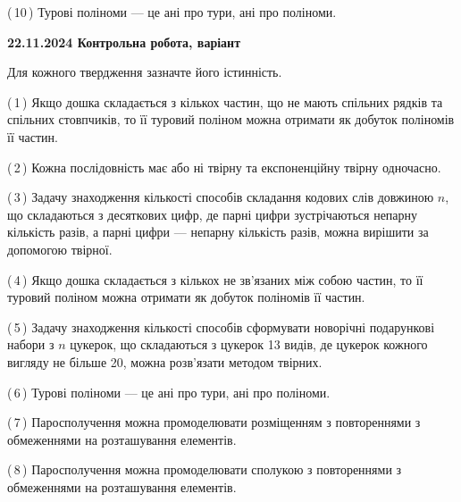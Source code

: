 \documentclass[12pt, ukrainian]{article}
\begin{document}
\begin {large}
\begin {large}
\begin {large}
\begin {large}
\begin {large}
\begin {large}
\begin {large}
\begin {large}
\begin {large}
\begin {large}
\begin {large}
\begin {large}
\begin {large}
\begin {large}
\begin {large}
\begin {large}
\begin {large}
\begin {large}
\begin {large}
\begin {large}
\begin {large}
\begin {large}
\begin {large}
\begin {large}
\begin {large}
\begin {large}
\begin {large}
\begin {large}
\begin {large}
{(\,10\,) Турові поліноми --- це ані про тури, ані про поліноми.%




\vspace{5mm}
}
\newpage

\begin {large}

\textbf{22.11.2024 Контрольна робота, варіант  }\par


{
Для кожного твердження зазначте його істинність.\par

\vspace{2mm}

(\,1\,) Якщо дошка складається з кількох частин, що не мають спільних рядків та спільних стовпчиків, то її туровий поліном можна отримати як добуток поліномів її частин.%



(\,2\,) Кожна послідовність має або ні твірну та експоненційну твірну одночасно.%



(\,3\,) Задачу знаходження кількості способів складання кодових слів довжиною $n$, що складаються з десяткових цифр, де парні цифри зустрічаються непарну кількість разів, а парні цифри — непарну кількість разів, можна вирішити за допомогою твірної.%



(\,4\,) Якщо дошка складається з кількох не зв’язаних між собою частин, то її туровий поліном можна отримати як добуток поліномів її частин.%



(\,5\,) Задачу знаходження кількості способів сформувати новорічні подарункові набори з $n$ цукерок, що складаються з цукерок 13 видів, де цукерок кожного вигляду не більше 20, можна розв’язати методом твірних.%



(\,6\,) Турові поліноми --- це ані про тури, ані про поліноми.%



(\,7\,) Паросполучення можна промоделювати розміщенням з повтореннями з обмеженнями на розташування елементів.%



(\,8\,) Паросполучення можна промоделювати сполукою з повтореннями з обмеженнями на розташування елементів.%



}
\end{large}
\end{large}
\end{large}
\end{large}
\end{large}
\end{large}
\end{large}
\end{large}
\end{large}
\end{large}
\end{large}
\end{large}
\end{large}
\end{large}
\end{large}
\end{large}
\end{large}
\end{large}
\end{large}
\end{large}
\end{large}
\end{large}
\end{large}
\end{large}
\end{large}
\end{large}
\end{large}
\end{large}
\end{large}
\end{large}
\end{document}
